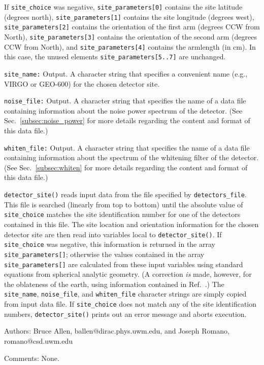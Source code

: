 \begin{description}
If {\tt site\_choice} was negative, {\tt site\_parameters[0]} contains the
site latitude (degrees north), {\tt site\_parameters[1]} contains the site
longitude (degrees west), {\tt site\_parameters[2]} contains the orientation
of the first arm (degrees CCW from North), {\tt site\_parameters[3]} contains
the orientation of the second arm (degrees CCW from North), and
{\tt site\_parameters[4]} contains the armlength (in cm).  In this case, the
unused elements {\tt site\_parameters[5..7]} are unchanged.
%
\item{\tt site\_name:} Output.
A character string that specifies 
a convenient name (e.g., VIRGO or GEO-600) for the chosen detector site.
%
\item{\tt noise\_file:} Output.
A character string that specifies
the name of a data file containing information about the noise 
power spectrum of the detector.
(See Sec.~\ref{subsec:noise_power} for more details regarding the
content and format of this data file.)
%
\item{\tt whiten\_file:} Output.
A character string that specifies
the name of a data file containing information about the 
spectrum of the whitening filter of the detector.
(See Sec.~\ref{subsec:whiten} for more details regarding the
content and format of this data file.)
\end{description}

{\tt detector\_site()} reads input data from the file specified by
{\tt detectors\_file}.
This file is searched (linearly from top to bottom) until the absolute value of
{\tt site\_choice} matches the site identification number for one of 
the detectors contained in this file.
The site location and orientation information for the chosen
detector site are then read into variables local to {\tt detector\_site()}.
If {\tt site\_choice} was negative, this information is returned in the
array {\tt site\_parameters[]}; otherwise
the values contained in the array {\tt site\_parameters[]} 
are calculated from these input variables using standard equations 
from spherical analytic geometry.
(A correction {\it is} made, however, for the oblateness of the earth, 
using information contained in Ref.~\cite{wortz}.)
The {\tt site\_name}, {\tt noise\_file}, and {\tt whiten\_file}
character strings are simply copied from input data file.
If {\tt site\_choice} does not match any of the site identification 
numbers, {\tt detector\_site()} prints out 
an error message and aborts execution.
%
\begin{description}
\item{Authors:}
Bruce Allen, ballen@dirac.phys.uwm.edu, and Joseph Romano, romano@csd.uwm.edu
\item{Comments:}
None.
\end{description}
\clearpage

